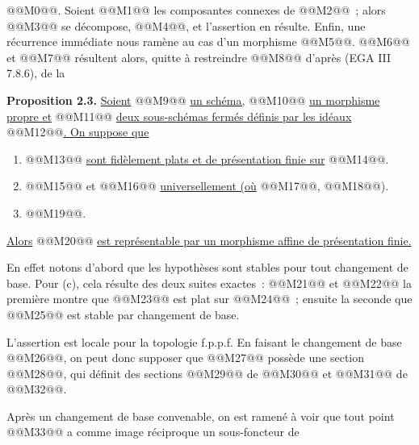 
@@M0@@. Soient @@M1@@ les composantes connexes de @@M2@@~; alors @@M3@@ se décompose, @@M4@@, et l'assertion en résulte. Enfin, une récurrence immédiate nous ramène au cas d'un morphisme @@M5@@. @@M6@@ et @@M7@@ résultent alors, quitte à restreindre @@M8@@ d'après (EGA III 7.8.6), de la

\textbf{Proposition 2.3.} \uline{Soient} @@M9@@ \uline{un schéma,} @@M10@@ \uline{un morphisme propre et} @@M11@@ \uline{deux sous-schémas fermés définis par les idéaux} @@M12@@\uline{. On suppose que}
\begin{enumerate}[label=\alph*)]
\item @@M13@@ \uline{sont fidèlement plats et de présentation finie sur} @@M14@@.
\item @@M15@@ et @@M16@@ \uline{universellement (où} @@M17@@, @@M18@@).
\item @@M19@@.
\end{enumerate}
\uline{Alors} @@M20@@ \uline{est représentable par un morphisme affine de présentation finie.}

En effet notons d'abord que les hypothèses sont stables pour tout changement de base. Pour (c), cela résulte des deux suites exactes~:
@@M21@@
et
@@M22@@
la première montre que @@M23@@ est plat sur @@M24@@~; ensuite la seconde que @@M25@@ est stable par changement de base.

L'assertion est locale pour la topologie f.p.p.f. En faisant le changement de base @@M26@@, on peut donc supposer que @@M27@@ possède une section @@M28@@, qui définit des sections @@M29@@ de @@M30@@ et @@M31@@ de @@M32@@.

Après un changement de base convenable, on est ramené à voir que tout point @@M33@@ a comme image réciproque un sous-foncteur de
